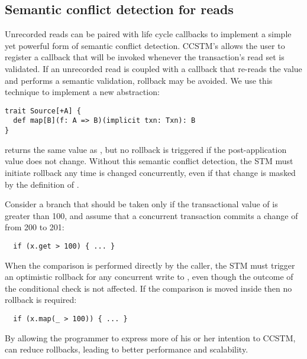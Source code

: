 \subsection{Semantic conflict detection for reads}
\label{sec:map}

Unrecorded reads can be paired with life cycle callbacks to implement a simple
yet powerful form of semantic conflict detection.  CCSTM's  allows the
user to register a callback that will be invoked whenever the transaction's read
set is validated.  If an unrecorded read is coupled with a callback that
re-reads the value and performs a semantic validation, rollback may be avoided.
We use this technique to implement a new abstraction:
\lstset{numbers=none}
\begin{lstlisting}
trait Source[+A] {
  def map[B](f: A => B)(implicit txn: Txn): B
}
\end{lstlisting}
\lstset{numbers=left}
 returns the same value as , but no rollback
is triggered if the post-application value does not change.  Without this
semantic conflict detection, the STM must initiate rollback any time 
is changed concurrently, even if that change is masked by the definition of
.

Consider a branch that should be taken only if the transactional value of
 is greater than 100, and assume that a concurrent transaction commits
a change of  from 200 to 201:
\lstset{numbers=none}
\begin{lstlisting}
  if (x.get > 100) { ... }
\end{lstlisting}
\lstset{numbers=left}
When the comparison is performed directly by the caller, the STM must
trigger an optimistic rollback for any concurrent write to , even
though
the outcome of the conditional check is not affected.  If the comparison is
moved inside  then no rollback is required:
\lstset{numbers=none}
\begin{lstlisting}
  if (x.map(_ > 100)) { ... }
\end{lstlisting}
\lstset{numbers=left}
By allowing the programmer to express more of his or her intention to CCSTM,
 can reduce rollbacks, leading to better performance and scalability.

